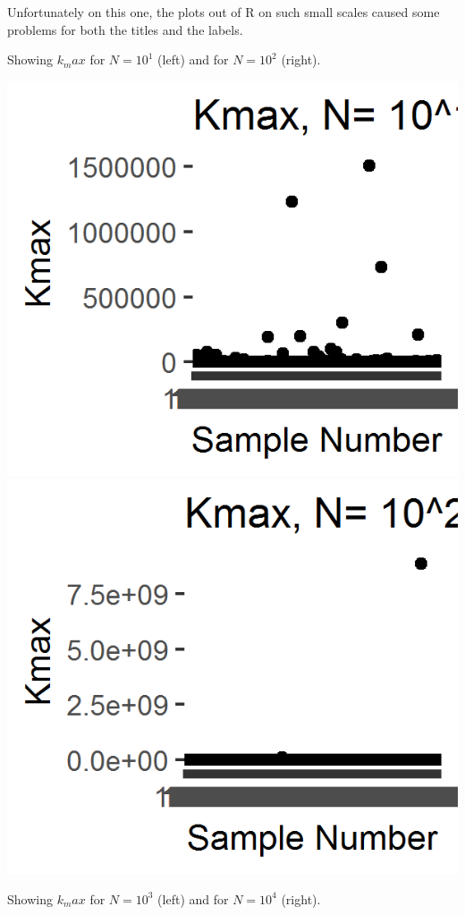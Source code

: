 Unfortunately on this one, the plots out of R on such small scales caused some problems for both the titles and the labels.

Showing $k_max$ for $N = 10^1$ (left) and for $N = 10^2$ (right).

\includegraphics{../images/Problem6_10^1.png}
\includegraphics{../images/Problem6_10^2.png}

Showing $k_max$ for $N = 10^3$ (left) and for $N = 10^4$ (right).


